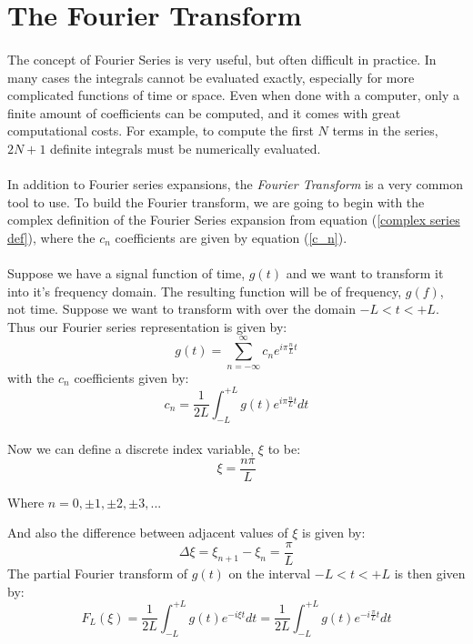 \documentclass[12pt,letterpaper]{article}
\begin{document}

\section{The Fourier Transform}
\paragraph*{}The concept of Fourier Series is very useful, but often difficult in practice. In many cases the integrals cannot be evaluated exactly, especially for more complicated functions of time or space. Even when done with a computer, only a finite amount of coefficients can be computed, and it comes with great computational costs. For example, to compute the first $N$ terms in the series, $2N + 1$ definite integrals must be numerically evaluated.
\paragraph*{}In addition to Fourier series expansions, the \textit{Fourier Transform} is a very common tool to use. To build the Fourier transform, we are going to begin with the complex  definition of the Fourier Series expansion from equation (\ref{complex series def}), where the $c_n$ coefficients are given by equation (\ref{c_n}). 
\paragraph*{}Suppose we have a signal function of time, $g(t)$ and we want to transform it into it's frequency domain. The resulting function will be of frequency, $g(f)$, not time. Suppose we want to transform with over the domain 
$-L < t < +L$. Thus our Fourier series representation is given by:
\begin{equation}
g(t) = \sum_{n=-\infty}^{\infty} c_n e^{i\pi\frac{n}{L}t}
\end{equation}
with the $c_n$ coefficients given by:
\begin{equation}
c_n = \frac{1}{2L}\int_{-L}^{+L} g(t) e^{i\pi\frac{n}{L}t} dt
\end{equation}
\paragraph*{}Now we can define a discrete index variable, $\xi$ to be:
\begin{equation}
\xi = \frac{n\pi}{L} 
\end{equation}
\begin{flushright}
Where $n = 0, \pm 1, \pm 2, \pm3, ...$
\end{flushright}
And also the difference between adjacent values of $\xi$ is given by:
\begin{equation}
\Delta \xi = \xi_{n+1} - \xi_{n} = \frac{\pi}{L}
\end{equation}
The partial Fourier transform of $g(t)$ on the interval $-L < t < +L$ is then given by:
\begin{equation}
F_L(\xi) = \frac{1}{2L} \int_{-L}^{+L} g(t) e^{-i\xi t} dt =
\frac{1}{2L} \int_{-L}^{+L} g(t) e^{-i\frac{\pi}{L}t} dt
\end{equation}
\end{document}
